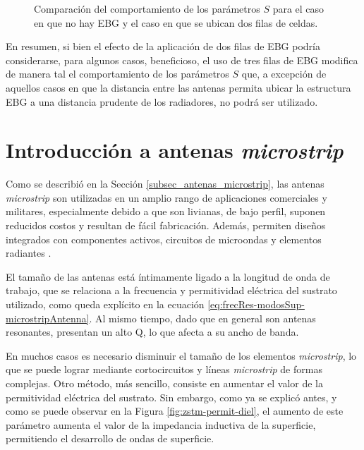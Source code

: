 \begin{figure}[H]
	\centering 
	\hspace{0pt}
	\caption{Comparación del comportamiento de los parámetros $S$ para el caso en que no hay EBG y el caso en que se ubican dos filas de celdas.}
	\label{fig:comparacion-23filas-ebg-mo}
\end{figure}

En resumen, si bien el efecto de la aplicación de dos filas de EBG podría considerarse, para algunos casos, beneficioso, el uso de tres filas de EBG modifica de manera tal el comportamiento de los parámetros $S$ que, a excepción de aquellos casos en que la distancia entre las antenas permita ubicar la estructura EBG a una distancia prudente de los radiadores, no podrá ser utilizado.

	
\section{Introducción a antenas \textit{microstrip}}

Como se describió en la Sección \ref{subsec_antenas_microstrip}, las antenas \textit{microstrip} son utilizadas en un amplio rango de aplicaciones comerciales y militares, especialmente debido a que son livianas, de bajo perfil, suponen reducidos costos y resultan de fácil fabricación. Además, permiten diseños integrados con componentes activos, circuitos de microondas y elementos radiantes \cite{Yang:EBGAntennas}.

El tamaño de las antenas está íntimamente ligado a la longitud de onda de trabajo, que se relaciona a la frecuencia y permitividad eléctrica del sustrato utilizado, como queda explícito en la ecuación \ref{eq:frecRes-modosSup-microstripAntenna}. Al mismo tiempo, dado que en general son antenas resonantes, presentan un alto Q, lo que afecta a su ancho de banda.

En muchos casos es necesario disminuir el tamaño de los elementos \textit{microstrip}, lo que se puede lograr mediante cortocircuitos y líneas \textit{microstrip} de formas complejas. Otro método, más sencillo, consiste en aumentar el valor de la permitividad eléctrica del sustrato. Sin embargo, como ya se explicó antes, y como se puede observar en la Figura \ref{fig:zstm-permit-diel}, el aumento de este parámetro aumenta el valor de la impedancia inductiva de la superficie, permitiendo el desarrollo de ondas de superficie.

